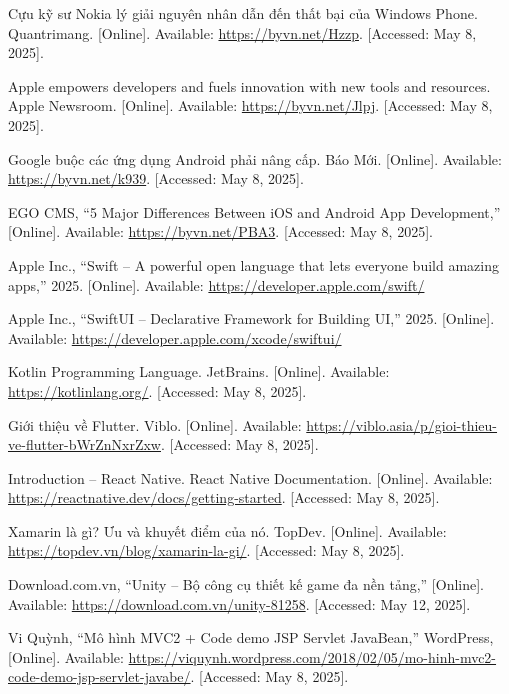 \documentclass[12pt]{report}
\begin{document}
\begin{thebibliography}{1}
  Cựu kỹ sư Nokia lý giải nguyên nhân dẫn đến thất bại của Windows Phone. Quantrimang. [Online]. Available: \url{https://byvn.net/Hzzp}. [Accessed: May 8, 2025].


  Apple empowers developers and fuels innovation with new tools and resources. Apple Newsroom. [Online]. Available: \url{https://byvn.net/Jlpj}. [Accessed: May 8, 2025].

  Google buộc các ứng dụng Android phải nâng cấp. Báo Mới. [Online]. Available: \url{https://byvn.net/k939}. [Accessed: May 8, 2025].


  EGO CMS, “5 Major Differences Between iOS and Android App Development,” [Online]. Available: \url{https://byvn.net/PBA3}. [Accessed: May 8, 2025].





  Apple Inc., ``Swift – A powerful open language that lets everyone build amazing apps,'' 2025. [Online]. Available: \url{https://developer.apple.com/swift/}

  Apple Inc., ``SwiftUI – Declarative Framework for Building UI,'' 2025. [Online]. Available: \url{https://developer.apple.com/xcode/swiftui/}

  Kotlin Programming Language. JetBrains. [Online]. Available: \url{https://kotlinlang.org/}. [Accessed: May 8, 2025].

  Giới thiệu về Flutter. Viblo. [Online]. Available: \url{https://viblo.asia/p/gioi-thieu-ve-flutter-bWrZnNxrZxw}. [Accessed: May 8, 2025].

  Introduction – React Native. React Native Documentation. [Online]. Available: \url{https://reactnative.dev/docs/getting-started}. [Accessed: May 8, 2025].

  Xamarin là gì? Ưu và khuyết điểm của nó. TopDev. [Online]. Available: \url{https://topdev.vn/blog/xamarin-la-gi/}. [Accessed: May 8, 2025].


  Download.com.vn, “Unity – Bộ công cụ thiết kế game đa nền tảng,” [Online]. Available: \url{https://download.com.vn/unity-81258}. [Accessed: May 12, 2025].

  Vi Quỳnh, “Mô hình MVC2 + Code demo JSP Servlet JavaBean,” WordPress, [Online]. Available: \url{https://viquynh.wordpress.com/2018/02/05/mo-hinh-mvc2-code-demo-jsp-servlet-javabe/}. [Accessed: May 8, 2025].


\end{thebibliography}
\end{document}
